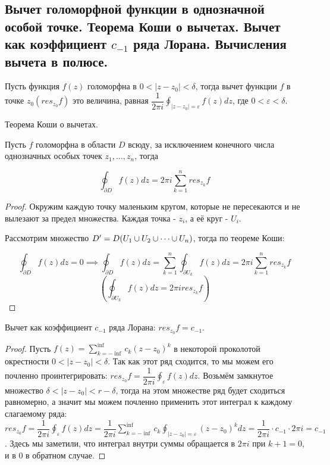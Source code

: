 \subsection{Вычет голоморфной функции в однозначной особой точке. Теорема Коши о вычетах. Вычет как коэффициент $c_{-1}$ ряда Лорана. Вычисления вычета в полюсе.}

\begin{definition*}
	Пусть функция $f(z)$ голоморфна в $0 < |z - z_0| < \delta$, тогда вычет функции $f$ в точке $z_0(res_{z_0}f)$ это величина, равная $\dfrac{1}{2\pi i} \oint_{|z - z_0| = \varepsilon} f(z)dz$, где $0 < \varepsilon < \delta$.
\end{definition*}

\begin{theorem*}
	Теорема Коши о вычетах.
	
	Пусть $f$ голоморфна в области $D$ всюду, за исключением конечного числа однозначных особых точек $z_1, \dots, z_n$, тогда
	
	$$\oint_{\partial D} f(z)dz = 2\pi i \sum_{k = 1}^{n} res_{z_k}f$$
\end{theorem*}

\begin{proof}
	Окружим каждую точку маленьким кругом, которые не пересекаются и не вылезают за предел множества. Каждая точка - $z_i$, а её круг - $U_i$.
	
	Рассмотрим множество $D' = D \\ (U_1 \cup U_2 \cup \dots \cup U_n)$, тогда по теореме Коши: 
	
	$$\oint_{\partial D} f(z)dz = 0 \implies \oint_{\partial D} f(z)dz = \sum_{k=1}^{n} \oint_{\partial U_k} f(z)dz = 2\pi i \sum_{k = 1}^{n} res_{z_k}f$$ $$(\oint_{\partial U_k} f(z)dz = 2\pi i res_{z_k}f )$$
\end{proof}

\begin{theorem*}
	Вычет как коэффициент $c_{-1}$ ряда Лорана: $res_{z_0}f = c_{-1}$.
\end{theorem*}

\begin{proof}
	Пусть $f(z) = \sum_{k = -\inf}^{\inf} c_k(z-z_0)^k$ в некоторой проколотой окрестности $0 < |z - z_0| < \delta$. Так как этот ряд
	сходится, то мы можем его почленно проинтегрировать: $res_{z_0}f = \dfrac{1}{2\pi i} \oint_{\varepsilon} f(z) dz$. Возьмём замкнутое множество $\delta < |z - z_0| < r - \delta$, тогда на этом множестве ряд будет сходиться равномерно, а значит мы можем почленно применить этот интеграл к каждому слагаемому ряда: $res_{z_0}f = \dfrac{1}{2\pi i} \oint_{\varepsilon} f(z)dz = \dfrac{1}{2\pi i} \sum_{k = -\inf}^{\inf} c_k \oint_{|z - z_0| = \varepsilon} (z - z_0)^k dz = \dfrac{1}{2\pi i} \cdot c_{-1} \cdot 2 \pi i = c_{-1}$. Здесь мы заметили, что интеграл внутри суммы обращается в $2\pi i$ при $k+1=0$, и в $0$ в обратном случае.
\end{proof}

